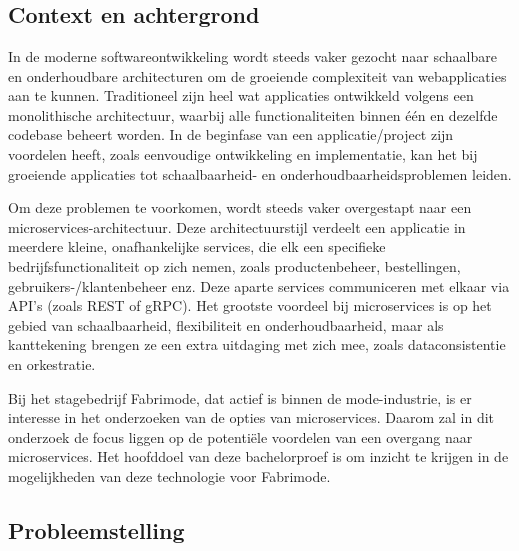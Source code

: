 
\chapter{}%
\label{ch:inleiding}

\section{Context en achtergrond}

In de moderne softwareontwikkeling wordt steeds vaker gezocht naar schaalbare en onderhoudbare architecturen om de groeiende complexiteit van webapplicaties aan te kunnen. Traditioneel zijn heel wat applicaties ontwikkeld volgens een monolithische architectuur, waarbij alle functionaliteiten binnen één en dezelfde codebase beheert worden. In de beginfase van een applicatie/project zijn voordelen heeft, zoals eenvoudige ontwikkeling en implementatie, kan het bij groeiende applicaties tot schaalbaarheid- en onderhoudbaarheidsproblemen leiden.

Om deze problemen te voorkomen, wordt steeds vaker overgestapt naar een microservices\--architectuur. Deze architectuurstijl verdeelt een applicatie in meerdere kleine, onafhankelijke services, die elk een specifieke bedrijfsfunctionaliteit op zich nemen, zoals productenbeheer, bestellingen, gebruikers-/klantenbeheer enz. Deze aparte services communiceren met elkaar via API's (zoals REST of gRPC). Het grootste voordeel bij microservices is op het gebied van schaalbaarheid, flexibiliteit en onderhoudbaarheid, maar als kanttekening brengen ze een extra uitdaging met zich mee, zoals dataconsistentie en orkestratie.

Bij het stagebedrijf Fabrimode, dat actief is binnen de mode-industrie, is er interesse in het onderzoeken van de opties van microservices. Daarom zal in dit onderzoek de focus liggen op de potentiële voordelen van een overgang naar microservices. Het hoofddoel van deze bachelorproef is om inzicht te krijgen in de mogelijkheden van deze technologie voor Fabrimode.

\section{Probleemstelling}

